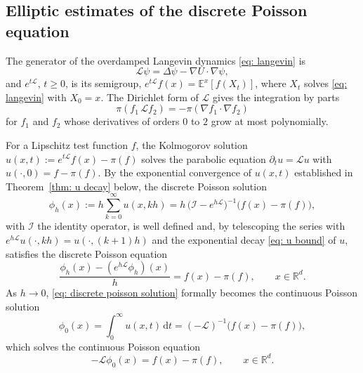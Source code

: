\documentclass{article}
\newcommand{\Ge}{\geqslant}
\newcommand{\D}{\mathrm{d}}
\numberwithin{equation}{section}
\begin{document}
\subsection{Elliptic estimates of the discrete Poisson equation}
\label{subsec: poisson}

The generator of the overdamped Langevin dynamics \eqref{eq: langevin} is
\begin{equation}
    \mathcal L \psi = \Delta \psi - \nabla U \cdot \nabla \psi ,
    \label{eq: generator}
\end{equation}
and $e^{t\mathcal L}$, $t \Ge 0$, is its semigroup, $e^{t\mathcal L} f(x) = \mathbb E^x[f(X_t)]$, where $X_t$ solves \eqref{eq: langevin} with $X_0 = x$. The Dirichlet form of $\mathcal L$ \citep{bakry2014analysis} gives the integration by parts
\begin{equation}
    \pi(f_1\, \mathcal L f_2) = -\pi(\nabla f_1 \cdot \nabla f_2)
    \label{eq: generator ibp}
\end{equation}
for $f_1$ and $f_2$ whose derivatives of orders $0$ to $2$ grow at most polynomially.

For a Lipschitz test function $f$, the Kolmogorov solution $u(x,t) := e^{t\mathcal L} f(x) - \pi(f)$ solves the parabolic equation $\partial_t u = \mathcal L u$ with $u(\cdot,0) = f - \pi(f)$. By the exponential convergence of $u(x,t)$ established in Theorem~\ref{thm: u decay} below, the discrete Poisson solution \citep{lu2025mse, ye2026mse}
\begin{equation}
    \phi_h(x) := h \sum_{k=0}^{\infty} u(x,kh) = h\, \bigl( \mathcal I - e^{h\mathcal L} \bigr)^{-1} \bigl( f(x) - \pi(f) \bigr) ,
    \label{eq: discrete poisson solution}
\end{equation}
with $\mathcal I$ the identity operator, is well defined and, by telescoping the series with $e^{h\mathcal L} u(\cdot, kh) = u(\cdot, (k+1)h)$ and the exponential decay \eqref{eq: u bound} of $u$, satisfies the discrete Poisson equation
\begin{equation}
    \frac{\phi_h(x) - (e^{h\mathcal L} \phi_h)(x)}{h} = f(x) - \pi(f) , \qquad x \in \mathbb R^d .
    \label{eq: discrete poisson}
\end{equation}
As $h \to 0$, \eqref{eq: discrete poisson solution} formally becomes the continuous Poisson solution
\begin{equation}
	\phi_0(x) = \int_0^\infty u(x,t)\, \D t = (-\mathcal L)^{-1}\bigl( f(x) - \pi(f) \bigr),
	\label{eq: continuous poisson solution}
\end{equation}
which solves the continuous Poisson equation \citep{mattingly2010convergence, vollmer2016exploration, brosse2019tamed}
\begin{equation}
    -\mathcal L \phi_0(x) = f(x) - \pi(f) , \qquad x \in \mathbb R^d .
    \label{eq: continuous poisson}
\end{equation}
\end{document}
